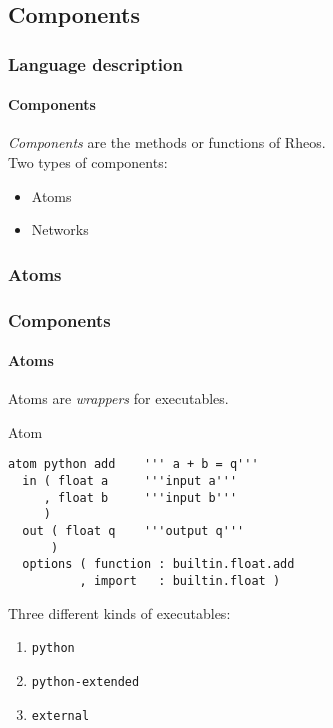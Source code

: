 \subsection*{Components}
\begin{frame}
\frametitle{Language description}
\framesubtitle{Components}

\emph{Components} are the methods or functions of Rheos.\\
\vspace{10pt}
\pause
Two types of components:
\begin{itemize}
\pause
\item Atoms
\pause
\item Networks
\end{itemize}

\end{frame}


\subsubsection*{Atoms}
\begin{frame}[fragile]
\frametitle{Components}
\framesubtitle{Atoms}

Atoms are \emph{wrappers} for executables.

\pause
\begin{block}{Atom}
\begin{verbatim}
atom python add    ''' a + b = q'''
  in ( float a     '''input a'''
     , float b     '''input b'''
     )
  out ( float q    '''output q'''
      )
  options ( function : builtin.float.add
          , import   : builtin.float )
\end{verbatim}
\end{block}

\pause
Three different kinds of executables:
\begin{enumerate}
\pause
\item \verb|python|
\pause
\item \verb|python-extended|
\pause
\item \verb|external|
\end{enumerate}


\end{frame}


